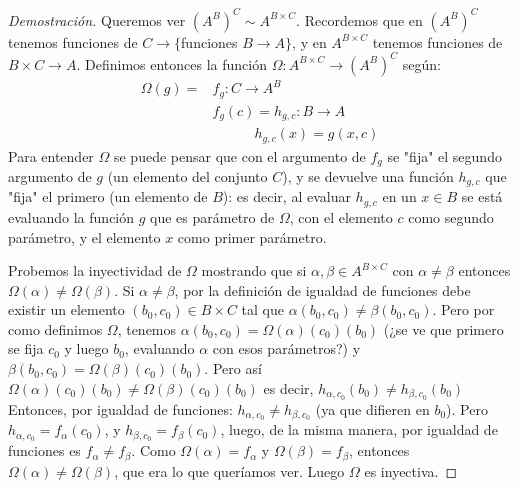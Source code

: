 \documentclass{article}
\begin{document}
\begin{proof}[Demostración]
Queremos ver $(A^B)^C \sim A^{B\times C}$. Recordemos que en $(A^B)^C$ tenemos funciones de $C \rightarrow \{$funciones $B \rightarrow A\}$, y en $A^{B\times C}$ tenemos funciones de $B \times C \rightarrow A$.
\newline
Definimos entonces la función $\Omega: A^{B\times C} \rightarrow (A^B)^C$ según: \\

\begin{align*}
\Omega(g) =& f_g: C \rightarrow A^B \\
& f_g(c) = h_{g,c}: B \rightarrow A \\ & \qquad \quad h_{g,c}(x) = g(x,c)
\end{align*}
Para entender $\Omega$ se puede pensar que con el argumento de $f_g$ se "fija" el segundo argumento de $g$ (un elemento del conjunto $C$), y se devuelve una función $h_{g,c}$ que "fija" el primero (un elemento de $B$): es decir, al evaluar $h_{g,c}$ en un $x\in B$ se está evaluando la función $g$ que es parámetro de $\Omega$, con el elemento $c$ como segundo parámetro, y el elemento $x$ como primer parámetro.
\newline

Probemos la inyectividad de $\Omega$ mostrando que si $\alpha, \beta \in A^{B \times C}$ con $\alpha \neq \beta$ entonces $\Omega(\alpha) \neq \Omega(\beta)$. Si $\alpha \neq \beta$, por la definición de igualdad de funciones debe existir un elemento $(b_0, c_0) \in B \times C$ tal que $\alpha(b_0, c_0) \neq \beta(b_0, c_0)$. \newline \break Pero por como definimos $\Omega$, tenemos $\alpha(b_0, c_0) = \Omega(\alpha)(c_0)(b_0)$ (¿se ve que primero se fija $c_0$ y luego $b_0$, evaluando $\alpha$ con esos parámetros?) y $\beta(b_0, c_0) = \Omega(\beta)(c_0)(b_0)$. \newline \newline
Pero así $\Omega(\alpha)(c_0)(b_0) \neq \Omega(\beta)(c_0)(b_0)$ es decir, $h_{\alpha,c_0}(b_0) \neq h_{\beta, c_0}(b_0)$ \newline \newline
Entonces, por igualdad de funciones: $h_{\alpha,c_0} \neq h_{\beta, c_0}$ (ya que difieren en $b_0$). \newline \newline
Pero $h_{\alpha,c_0} = f_\alpha(c_0)$, y $h_{\beta,c_0} = f_\beta(c_0)$, luego, de la misma manera, por igualdad de funciones es $f_\alpha \neq f_\beta$. \newline \newline
Como $\Omega(\alpha) = f_\alpha$ y $\Omega(\beta) = f_\beta$, entonces $\Omega(\alpha) \neq \Omega(\beta)$, que era lo que queríamos ver. Luego $\Omega$ es inyectiva.\newline


\end{proof}
\end{document}
